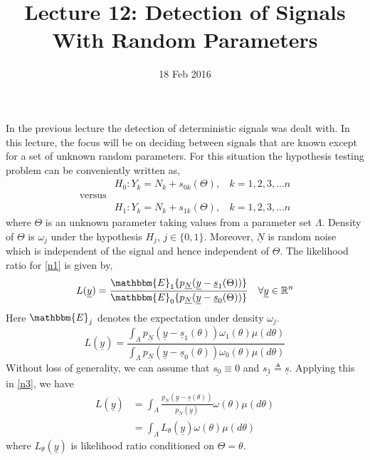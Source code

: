 \documentclass[a4paper,english,12pt]{article}
\title{Lecture 12: Detection of Signals With Random Parameters}
\date{18 Feb 2016}
\author{}
\begin{document}
\maketitle
In the previous lecture the detection of deterministic signals was dealt with. In this lecture, the focus will be on deciding between signals that are known except for a set of unknown random parameters. For this situation the hypothesis testing problem can be conveniently written as,
\begin{equation}
 \label{n1}
      \begin{aligned}
      & H_0 : Y_k=N_k+s_{0k}(\Theta) ,\ \ \ \ k=1,2,3,...n  \\
      \mbox{versus} & \\
      & H_1 : Y_k=N_k+s_{1k}(\Theta) ,\ \ \ \ k=1,2,3,...n
      \end{aligned}
 \end{equation}
 where $\Theta$ is an unknown parameter taking values from a parameter set $\Lambda$. Density of $\Theta$ is $\omega_j$ under the hypothesis $H_j$, $j\in \{0,1\}$. Moreover, $\underline{N}$ is random noise which is independent of the signal and hence independent of $\Theta$.
 The likelihood ratio for \eqref{n1} is given by,
 \begin{equation*}
 L(\underline{y})=\frac{\mathbbm{E}_1 \lbrace p_{\underline{N}}(\underline{y}-\underline{s}_1(\Theta))\rbrace}{\mathbbm{E}_0 \lbrace p_{\underline{N}}(\underline{y}-\underline{s}_0(\Theta))\rbrace}  \ \ \  \forall \underline{y}\in \R^ n
 \end{equation*}
 Here $\mathbbm{E}_j$ denotes the expectation under density $\omega_j$. 
 \begin{equation}
 \label{n3}
 L(\underline{y})=\frac{\int_\Lambda  p_{\underline{N}}(\underline{y}-\underline{s}_1(\theta))\omega_1(\theta)\mu (d\theta)}{\int_\Lambda  p_{\underline{N}}(\underline{y}-\underline{s}_0(\theta))\omega_0(\theta)\mu (d\theta)} 
 \end{equation}
  Without loss of generality, we can assume that $\underline{s_0}\equiv 0$ and $\underline{s_1}\triangleq \underline{s}$. Applying this in \eqref{n3}, we have
\begin{align} 
 L(\underline{y})&=\int_\Lambda \frac{ p_{\underline{N}}(\underline{y}-\underline{s}(\theta))}{p_{\underline{N}}(\underline{y})}\omega(\theta)\mu (d\theta) \\ 
  \label{n5}
 &=\int_\Lambda L_\theta(\underline{y})\omega(\theta)\mu (d\theta)  
\end{align} 
where $L_\theta(\underline{y})$ is likelihood ratio conditioned on $\Theta = \theta$.
\end{document}
